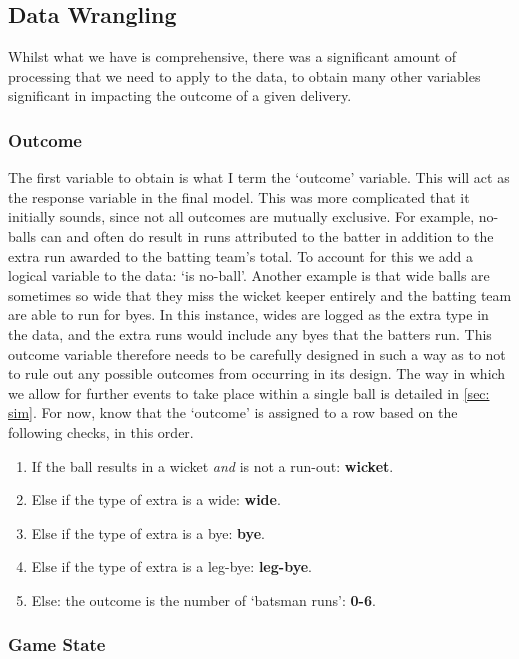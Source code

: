 \subsection{Data Wrangling}

Whilst what we have is comprehensive, there was a significant amount of processing that we need to apply to the data, to obtain many other variables significant in impacting the outcome of a given delivery.

\subsubsection{Outcome}

The first variable to obtain is what I term the ‘outcome’ variable. This will act as the response variable in the final model. This was more complicated that it initially sounds, since not all outcomes are mutually exclusive. For example, no-balls can and often do result in runs attributed to the batter in addition to the extra run awarded to the batting team’s total. To account for this we add a logical variable to the data: ‘is no-ball’. Another example is that wide balls are sometimes so wide that they miss the wicket keeper entirely and the batting team are able to run for byes. In this instance, wides are logged as the extra type in the data, and the extra runs would include any byes that the batters run. This outcome variable therefore needs to be carefully designed in such a way as to not to rule out any possible outcomes from occurring in its design. The way in which we allow for further events to take place within a single ball is detailed in \autoref{sec: sim}. For now, know that the ‘outcome’ is assigned to a row based on the following checks, in this order.

\begin{enumerate}
    \setlength{\itemsep}{-0em}
    \item If the ball results in a wicket \textit{and} is not a run-out: \textbf{wicket}.
    \item Else if the type of extra is a wide: \textbf{wide}.
    \item Else if the type of extra is a bye: \textbf{bye}.
    \item Else if the type of extra is a leg-bye: \textbf{leg-bye}.
    \item Else: the outcome is the number of ‘batsman runs’: \textbf{0-6}.
\end{enumerate}

\subsubsection{Game State}

